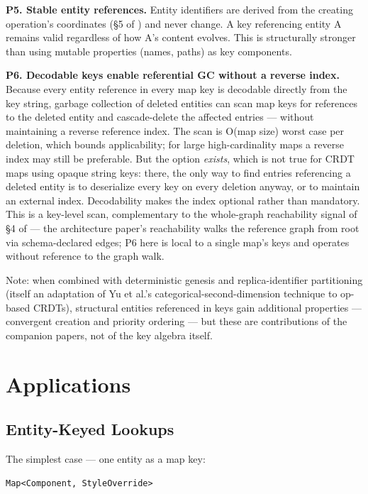 \textbf{P5. Stable entity references.} Entity identifiers are derived from the creating operation's coordinates (\S 5 of \cite{plexus:arch}) and never change. A key referencing entity A remains valid regardless of how A's content evolves. This is structurally stronger than using mutable properties (names, paths) as key components.

\textbf{P6. Decodable keys enable referential GC without a reverse index.} Because every entity reference in every map key is decodable directly from the key string, garbage collection of deleted entities can scan map keys for references to the deleted entity and cascade-delete the affected entries --- without maintaining a reverse reference index. The scan is O(map size) worst case per deletion, which bounds applicability; for large high-cardinality maps a reverse index may still be preferable. But the option \emph{exists}, which is not true for CRDT maps using opaque string keys: there, the only way to find entries referencing a deleted entity is to deserialize every key on every deletion anyway, or to maintain an external index. Decodability makes the index optional rather than mandatory. This is a key-level scan, complementary to the whole-graph reachability signal of \S 4 of \cite{plexus:arch} --- the architecture paper's reachability walks the reference graph from root via schema-declared edges; P6 here is local to a single map's keys and operates without reference to the graph walk.

Note: when combined with deterministic genesis \cite{plexus:genesis} and replica-identifier partitioning \cite{plexus:partitioning} (itself an adaptation of Yu et al.'s categorical-second-dimension technique to op-based CRDTs), structural entities referenced in keys gain additional properties --- convergent creation and priority ordering --- but these are contributions of the companion papers, not of the key algebra itself.

\section{Applications}

\subsection{Entity-Keyed Lookups}

The simplest case --- one entity as a map key:

\begin{lstlisting}
Map<Component, StyleOverride>
\end{lstlisting}

